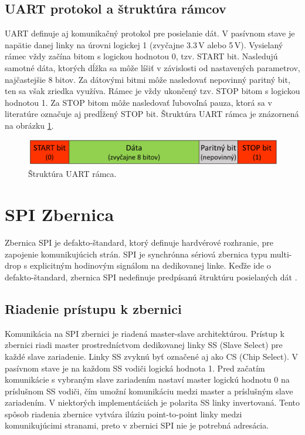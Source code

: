 \subsection{UART protokol a štruktúra rámcov}
UART definuje aj komunikačný protokol pre posielanie dát. V pasívnom stave je napätie danej linky na úrovni logickej 1 (zvyčajne 3.3\,V alebo 5\,V). Vysielaný rámec vždy začína bitom s logickou hodnotou 0, tzv. START bit. Nasledujú samotné dáta, ktorých dĺžka sa môže líšiť v závislosti od nastavených parametrov, najčastejšie 8 bitov. Za dátovými bitmi môže nasledovať nepovinný paritný bit, ten sa však zriedka využíva. Rámec je vždy ukončený tzv. STOP bitom s logickou hodnotou 1. Za STOP bitom môže nasledovať ľubovoľná pauza, ktorá sa v literatúre označuje aj predĺžený STOP bit. Štruktúra UART rámca je znázornená na obrázku \ref{obr:uartFrame}.

\begin{figure}
    \centerline{\includegraphics[width=1\textwidth]{images/uartFrame.png}}
    \caption[Štruktúra UART rámca]{Štruktúra UART rámca.}
    \label{obr:uartFrame}
\end{figure}

\section{SPI Zbernica}
Zbernica SPI je defakto-štandard, ktorý definuje hardvérové rozhranie, pre zapojenie komunikujúcich strán. SPI je synchrónna sériová zbernica typu multi-drop s explicitným hodinovým signálom na dedikovanej linke. Keďže ide o defakto-štandard, zbernica SPI nedefinuje predpísanú štruktúru posielaných dát \cite{spiBus}.

\subsection{Riadenie prístupu k zbernici}
Komunikácia na SPI zbernici je riadená master-slave architektúrou. Prístup k zbernici riadi master prostredníctvom dedikovanej linky SS (Slave Select) pre každé slave zariadenie. Linky SS zvyknú byť označené aj ako CS (Chip Select). V pasívnom stave je na každom SS vodiči logická hodnota 1. Pred začatím komunikácie s vybraným slave zariadením nastaví master logickú hodnotu 0 na príslušnom SS vodiči, čím umožní komunikáciu medzi master a príslušným slave zariadením. V niektorých implementáciách je polarita SS linky invertovaná. Tento spôsob riadenia zbernice vytvára ilúziu point-to-point linky medzi komunikujúcimi stranami, preto v zbernici SPI nie je potrebná adresácia.

